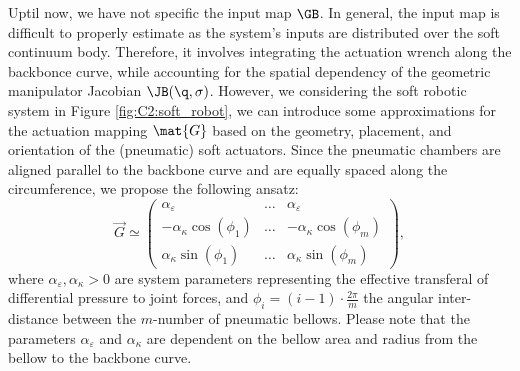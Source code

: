 \begin{asm} \editl Uptil now, we have not specific the input map $\GB$. In general, the input map is difficult to properly estimate as the system's inputs are distributed over the soft continuum body. Therefore, it involves integrating the actuation wrench along the backbonce curve, while accounting for the spatial dependency of the geometric manipulator Jacobian $\JB(\q,\sigma)$. However, we considering the soft robotic system in Figure \ref{fig:C2:soft_robot}, we can introduce some approximations for the actuation mapping $\mat{G}$ based on the geometry, placement, and orientation of the (pneumatic) soft actuators. Since the pneumatic chambers are aligned parallel to the backbone curve and are equally spaced along the circumference, we propose the following ansatz: \editr
%
\begin{equation}
\vec{G} \simeq \begin{pmatrix} \alpha_{\varepsilon} & \hdots & \alpha_{\varepsilon} \\ -\alpha_{\kappa} \cos(\phi_1) & \hdots & -\alpha_{\kappa} \cos(\phi_m) \\ \alpha_{\kappa} \sin(\phi_1) & \hdots & \alpha_{\kappa} \sin(\phi_m) \end{pmatrix},
\label{eq:C2:mapping_H}
\end{equation}
%
where $\alpha_{\varepsilon},\alpha_{\kappa} > 0$ are system parameters representing the effective transferal of differential pressure to joint forces, and $\phi_i = (i-1)\cdot\tfrac{2\pi}{m}$ the angular inter-distance between the $m$-number of pneumatic bellows. Please note that the parameters $\alpha_{\varepsilon}$ and $\alpha_{\kappa}$ are dependent on the bellow area and radius from the bellow to the backbone curve.
\end{asm}